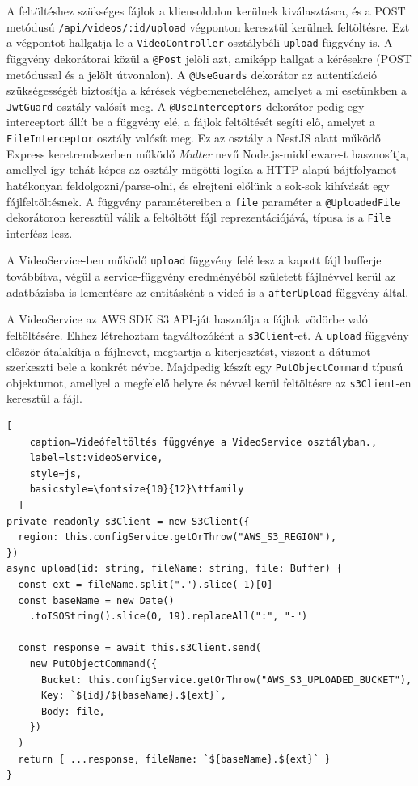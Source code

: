 A feltöltéshez szükséges fájlok a kliensoldalon kerülnek kiválasztásra, és a POST metódusú \verb|/api/videos/:id/upload| végponton keresztül kerülnek feltöltésre. Ezt a végpontot hallgatja le a \verb|VideoController| osztálybéli \verb|upload| függvény is. A függvény dekorátorai közül a \verb|@Post| jelöli azt, amiképp hallgat a kérésekre (POST metódussal és a jelölt útvonalon). A \verb|@UseGuards| dekorátor az autentikáció szükségességét biztosítja a kérések végbemeneteléhez, amelyet a mi esetünkben a \verb|JwtGuard| osztály valósít meg. A \verb|@UseInterceptors| dekorátor pedig egy interceptort állít be a függvény elé, a fájlok feltöltését segíti elő, amelyet a \verb|FileInterceptor| osztály valósít meg. Ez az osztály a NestJS alatt működő Express keretrendszerben működő \emph{Multer} nevű Node.js-middleware-t hasznosítja, amellyel így tehát képes az osztály mögötti logika a HTTP-alapú bájtfolyamot hatékonyan feldolgozni/parse-olni, és elrejteni előlünk a sok-sok kihívását egy fájlfeltöltésnek. A függvény paramétereiben a \verb|file| paraméter a \verb|@UploadedFile| dekorátoron keresztül válik a feltöltött fájl reprezentációjává, típusa is a \verb|File| interfész lesz.

A VideoService-ben működő \verb|upload| függvény felé lesz a kapott fájl bufferje továbbítva, végül a service-függvény eredményéből született fájlnévvel kerül az adatbázisba is lementésre az entitásként a videó is a \verb|afterUpload| függvény által.

A VideoService az AWS SDK S3 API-ját használja a fájlok vödörbe való feltöltésére. Ehhez létrehoztam tagváltozóként a \verb|s3Client|-et. A \verb|upload| függvény először átalakítja a fájlnevet, megtartja a kiterjesztést, viszont a dátumot szerkeszti bele a konkrét névbe. Majdpedig készít egy \verb|PutObjectCommand| típusú objektumot, amellyel a megfelelő helyre és névvel kerül feltöltésre az \verb|s3Client|-en keresztül a fájl.

\begin{minipage}{0.92\textwidth}
  \begin{lstlisting}[
    caption=Videófeltöltés függvénye a VideoService osztályban.,
    label=lst:videoService,
    style=js,
    basicstyle=\fontsize{10}{12}\ttfamily
  ]
private readonly s3Client = new S3Client({
  region: this.configService.getOrThrow("AWS_S3_REGION"),
})
async upload(id: string, fileName: string, file: Buffer) {
  const ext = fileName.split(".").slice(-1)[0]
  const baseName = new Date()
    .toISOString().slice(0, 19).replaceAll(":", "-")

  const response = await this.s3Client.send(
    new PutObjectCommand({
      Bucket: this.configService.getOrThrow("AWS_S3_UPLOADED_BUCKET"),
      Key: `${id}/${baseName}.${ext}`,
      Body: file,
    })
  )
  return { ...response, fileName: `${baseName}.${ext}` }
}
\end{lstlisting}
\end{minipage}

